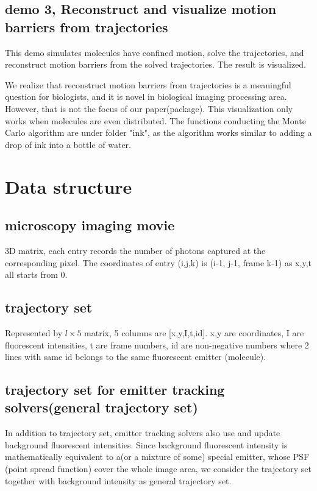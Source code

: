 \documentclass[a4paper]{article}
\begin{document}
\begin{CJK*}{UTF8}{kai}
\subsection{demo 3, Reconstruct and visualize motion barriers from trajectories}
This demo simulates molecules have confined motion, solve the trajectories, and reconstruct motion barriers from the solved trajectories. The result is visualized.

We realize that reconstruct motion barriers from trajectories is a meaningful question for biologists, and it is novel in biological imaging processing area. However, that is not the focus of our paper(package). This visualization only works when molecules are even distributed. The functions conducting the Monte Carlo algorithm are under folder "ink", as the algorithm works similar to adding a drop of ink into a bottle of water.

\section{Data structure}
\subsection{microscopy imaging movie}
3D matrix, each entry records the number of photons captured at the corresponding pixel. The coordinates of entry (i,j,k) is (i-1, j-1, frame k-1) as x,y,t all starts from 0.
\subsection{trajectory set}
Represented by $l\times 5$ matrix, 5 columns are [x,y,I,t,id]. x,y are coordinates, I are fluorescent intensities, t are frame numbers, id are non-negative numbers where 2 lines with same id belongs to the same fluorescent emitter (molecule).

\subsection{trajectory set for emitter tracking solvers(general trajectory set)}
In addition to trajectory set, emitter tracking solvers also use and update background fluorescent intensities. Since background fluorescent intensity is mathematically equivalent to a(or a mixture of some) special emitter, whose PSF (point spread function) cover the whole image area, we consider the trajectory set together with background intensity as general trajectory set. 


\end{CJK*}
\end{document}
